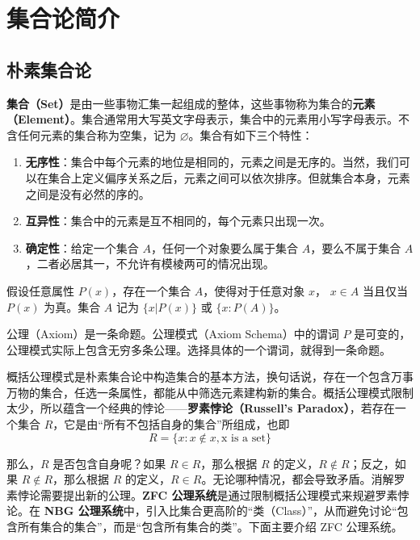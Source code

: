 \chapter{集合论简介}
\section{朴素集合论}
\textbf{集合（Set）}是由一些事物汇集一起组成的整体，这些事物称为集合的\textbf{元素（Element）}。集合通常用大写英文字母表示，集合中的元素用小写字母表示。不含任何元素的集合称为空集，记为 $\varnothing$。集合有如下三个特性：
\begin{enumerate}
\item \textbf{无序性}：集合中每个元素的地位是相同的，元素之间是无序的。当然，我们可以在集合上定义偏序关系之后，元素之间可以依次排序。但就集合本身，元素之间是没有必然的序的。 
\item \textbf{互异性}：集合中的元素是互不相同的，每个元素只出现一次。
\item \textbf{确定性}：给定一个集合 $A$，任何一个对象要么属于集合 $A$，要么不属于集合 $A$，二者必居其一，不允许有模棱两可的情况出现。
\end{enumerate}

\begin{axiom}
    假设任意属性 $P(x)$，存在一个集合 $A$，使得对于任意对象 $x$， $x\in A$ 当且仅当 $P(x)$ 为真。集合 $A$ 记为 $\{x|P(x)\}$ 或 $\{x:P(A)\}$。
\end{axiom}

\begin{note}
    公理（Axiom）是一条命题。公理模式（Axiom Schema）中的谓词 $P$ 是可变的，公理模式实际上包含无穷多条公理。选择具体的一个谓词，就得到一条命题。
\end{note}
\vspace{1em}

概括公理模式是朴素集合论中构造集合的基本方法，换句话说，存在一个包含万事万物的集合，任选一条属性，都能从中筛选元素建构新的集合。概括公理模式限制太少，所以蕴含一个经典的悖论——\textbf{罗素悖论（Russell's Paradox）}，若存在一个集合 $R$，它是由“所有不包括自身的集合”所组成，也即
    \[
        R = \{x:x\notin x, \text{x is a set}\}
    \]

那么，$R$ 是否包含自身呢？如果 $R\in R$，那么根据 $R$ 的定义，$R\notin R$；反之，如果 $R\notin R$，那么根据 $R$ 的定义，$R\in R$。无论哪种情况，都会导致矛盾。消解罗素悖论需要提出新的公理。\textbf{ZFC 公理系统}是通过限制概括公理模式来规避罗素悖论。在 \textbf{NBG 公理系统}中，引入比集合更高阶的“类（Class）”，从而避免讨论“包含所有集合的集合”，而是“包含所有集合的类”。下面主要介绍 ZFC 公理系统。
